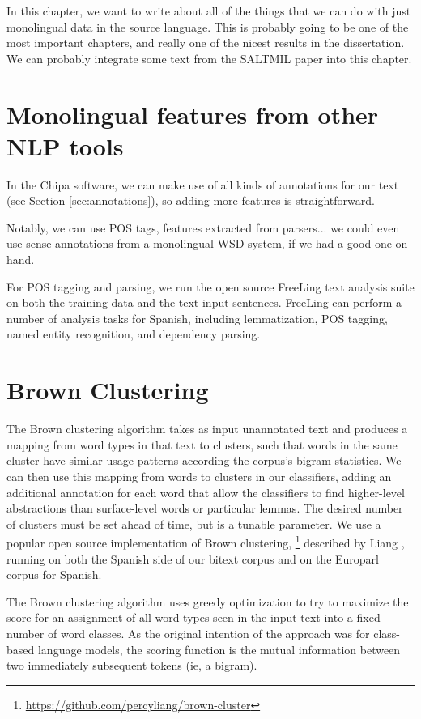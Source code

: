 In this chapter, we want to write about all of the things that we can do with
just monolingual data in the source language.
This is probably going to be one of the most important chapters, and really one
of the nicest results in the dissertation.
We can probably integrate some text from the SALTMIL paper into this chapter.


\section{Monolingual features from other NLP tools}
In the Chipa software, we can make use of all kinds of annotations for our
text (see Section \ref{sec:annotations}), so adding more features is
straightforward.

Notably, we can use POS tags, features extracted from parsers... we could even
use sense annotations from a monolingual WSD system, if we had a good one on
hand.

For POS tagging and parsing, we run the open source FreeLing text analysis
suite \cite{padro12} on both the training data and the text input sentences.
FreeLing can perform a number of analysis tasks for Spanish, including
lemmatization, POS tagging, named entity recognition, and dependency parsing.



\section{Brown Clustering}
The Brown clustering algorithm takes as input unannotated text and produces a
mapping from word types in that text to clusters, such that words in the same
cluster have similar usage patterns according the corpus's bigram statistics.
We can then use this mapping from words to clusters in our classifiers, adding
an additional annotation for each word that allow the classifiers to find
higher-level abstractions than surface-level words or particular lemmas.
The desired number of clusters must be set ahead of time, but is a tunable
parameter.
We use a popular open source implementation of Brown clustering,
\footnote{\url{https://github.com/percyliang/brown-cluster}} described by
Liang \cite{Liang05semi-supervisedlearning}, running on both the Spanish
side of our bitext corpus and on the Europarl corpus \cite{europarl} for
Spanish.

The Brown clustering algorithm uses greedy optimization to try to maximize the
score for an assignment of all word types seen in the input text into a fixed
number of word classes. As the original intention of the approach was for
class-based language models, the scoring function is the mutual information
between two immediately subsequent tokens (ie, a bigram).

